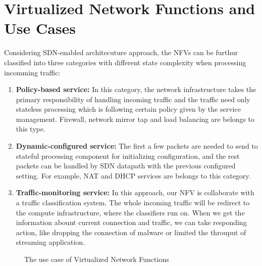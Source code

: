\section{Virtualized Network Functions and Use Cases}
Considering SDN-enabled architecuture approach, the NFVs can be furthur classified into three categories with different state complexity when processing incomming traffic:

\begin{enumerate}[1)]
  \item{\bf{Policy-based service:}}
  In this category, the network infrastructure takes the primary responsibility of handling incoming traffic and the traffic need only stateless processing which is following certain policy given by the service management. Firewall, network mirror tap and load balancing are belongs to this type.

  \item{\bf{Dynamic-configured service:}}
  The first a few packets are needed to send to stateful processing component for initializing configuration, and the rest packets can be handled by SDN datapath with the previous configured setting. For example, NAT and DHCP services are belongs to this category.

  \item{\bf{Traffic-monitoring service:}}
  In this approach, our NFV is collaborate with a traffic classification system. The whole incoming traffic will be redirect to the compute infrastructure, where the classifiers run on. When we get the information abount current connection and traffic, we can take responding action, like dropping the connection of malware or limited the throuput of streaming application.
\end{enumerate}

\begin{figure}[tb!]
  \centering
  \begin{minipage}{\linewidth}
    \subfigure[Firewall]{
    \centering
    \def\svgwidth{\linewidth}
    
    \label{fig:fw_use}
    }
    \subfigure[NAT]{
    \centering
    \def\svgwidth{\linewidth}
    
    \label{fig:nat_use}
    }
  \end{minipage}
  \subfigure[QoS]{
  \centering
  \def\svgwidth{\linewidth}
  
  \label{fig:qos_use}
  }
  \hfill
  \caption{The use case of Virtualized Network Functions}
  \label{fig:vnf_use}
\end{figure}

